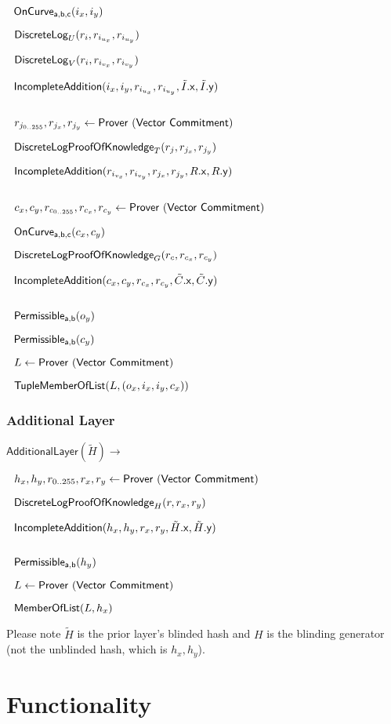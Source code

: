 \documentclass[]{article}
\begin{document}
$~~\mathsf{OnCurve_{a,b,c}}(i_x, i_y)$

$~~\mathsf{DiscreteLog}_U(r_i, r_{i_{u_x}}, r_{i_{u_y}})$

$~~\mathsf{DiscreteLog}_V(r_i, r_{i_{v_x}}, r_{i_{v_y}})$

$~~\mathsf{IncompleteAddition}(i_x, i_y, r_{i_{u_x}}, r_{i_{u_y}}, \tilde{I}\mathsf{.x}, \tilde{I}\mathsf{.y})$

$ $

$~~r_{j_{0..255}}, r_{j_x}, r_{j_y}\leftarrow \mathsf{Prover ~(Vector ~Commitment)}$

$~~\mathsf{DiscreteLogProofOfKnowledge}_T(r_j, r_{j_x}, r_{j_y})$

$~~\mathsf{IncompleteAddition}(r_{i_{v_x}}, r_{i_{v_y}}, r_{j_x}, r_{j_y}, R\mathsf{.x}, R\mathsf{.y})$

$ $

$~~c_x, c_y, r_{c_{0..255}}, r_{c_x}, r_{c_y}\leftarrow \mathsf{Prover ~(Vector ~Commitment)}$

$~~\mathsf{OnCurve_{a,b,c}}(c_x, c_y)$

$~~\mathsf{DiscreteLogProofOfKnowledge}_G(r_c, r_{c_x}, r_{c_y})$

$~~\mathsf{IncompleteAddition}(c_x, c_y, r_{c_x}, r_{c_y}, \tilde{C}\mathsf{.x}, \tilde{C}\mathsf{.y})$

$ $

$~~\mathsf{Permissible_{a, b}}(o_y)$

$~~\mathsf{Permissible_{a, b}}(c_y)$

$~~L\leftarrow \mathsf{Prover ~(Vector ~Commitment)}$

$~~\mathsf{TupleMemberOfList}(L, (o_x, i_x, i_y, c_x))$

\subsubsection{Additional Layer}

$\mathsf{AdditionalLayer}(\tilde{H}) \rightarrow$

$~~h_x, h_y, r_{0..255}, r_x, r_y\leftarrow \mathsf{Prover ~(Vector ~Commitment)}$

$~~\mathsf{DiscreteLogProofOfKnowledge}_H(r, r_x, r_y)$

$~~\mathsf{IncompleteAddition}(h_x, h_y, r_x, r_y, \tilde{H}\mathsf{.x}, \tilde{H}\mathsf{.y})$

$ $

$~~\mathsf{Permissible_{a, b}}(h_y)$

$~~L\leftarrow \mathsf{Prover ~(Vector ~Commitment)}$

$~~\mathsf{MemberOfList}(L, h_x)$

Please note $\tilde{H}$ is the prior layer's blinded hash and $H$ is the blinding generator (not the unblinded hash, which is $h_x, h_y$).

\section{Functionality}
\end{document}
